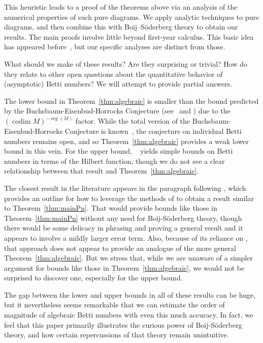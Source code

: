 \documentclass[12pt]{amsart}
\theoremstyle{remark}
\newcommand{\reg}{\operatorname{reg}}
\newcommand{\codim}{\operatorname{codim}}
\begin{document}
This heuristic leads to a proof of the theorems above via an analysis of the numerical properties of such pure diagrams.
We apply analytic techniques to pure diagrams, and then combine this with Boij--S\"oderberg theory to obtain our results.  The main proofs involve little beyond first-year calculus.  This basic idea has appeared before~\cite{erman-beh,mccullough,boocher-wigglesworth}, but our specific analyses are distinct from those.

\medskip


What should we make of these results?  Are they surprising or trivial?  How do they relate to other open questions about the quantitative behavior of (asymptotic) Betti numbers?  We will attempt to provide partial answers.

The lower bound in Theorem~\ref{thm:algebraic} is smaller than the bound predicted by the Buchsbaum-Eisenbud-Horrocks Conjecture (see~\cite[p.\ 453]{buchs-eis-gor} and \cite[Problem 24]{hartshorne-vb}) due to the $(\codim M)^{-\reg(M)}$ factor.  While the total version of the Buchsbaum-Eisenbud-Horrocks Conjecture is known~\cite{walker}, the conjecture on individual Betti numbers remains open, and so Theorem~\ref{thm:algebraic} provides a weak lower bound in this vein.
For the upper bound, ~\cite[Proposition~2.7]{eisenbud-gos} yields simple bounds on Betti numbers in terms of the Hilbert function, though  we do not see a clear relationship between that result and Theorem~\ref{thm:algebraic}.  

The closest result in the literature appears in the paragraph following \cite[Conjecture 3.2]{EL-progress-and-questions}, which provides an outline for how to leverage the methods of \cite{EEL-quick} to obtain a result similar to Theorem~\ref{thm:mainPn}.  That would provide bounds like those in Theorem~\ref{thm:mainPn} without any need for Boij-S\"oderberg theory, though there would be some delicacy in phrasing and proving a general result and it appears to involve a mildly larger error term.  Also, because of its reliance on \cite{EEL-quick}, that approach does not appear to provide an analogue of the more general Theorem~\ref{thm:algebraic}.
But we stress that, while we are unaware of a simpler argument for bounds like those in Theorem~\ref{thm:algebraic}, we would not be surprised to discover one, especially for the upper bound.

The gap between the lower and upper bounds in all of these results can be huge, but it nevertheless seems remarkable that we can estimate the order of magnitude of algebraic Betti numbers with even this much accuracy. 
 In fact, we feel that this paper primarily illustrates the curious power of Boij-S\"oderberg theory, and how certain repercussions of that theory remain unintuitive.
\end{document}
